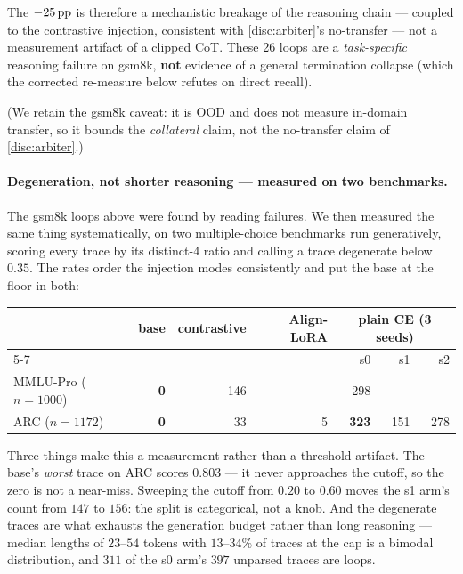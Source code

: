 The $-25\,\mathrm{pp}$ is therefore a mechanistic breakage of the reasoning chain --- coupled
to the contrastive injection, consistent with \cref{disc:arbiter}'s no-transfer ---
not a measurement artifact of a clipped CoT. These 26 loops are a
\emph{task-specific} reasoning failure on gsm8k, \textbf{not} evidence of a general
termination collapse (which the corrected re-measure below refutes on direct
recall).

(We retain the gsm8k caveat: it is OOD and does not measure in-domain transfer, so
it bounds the \emph{collateral} claim, not the no-transfer claim of
\cref{disc:arbiter}.)

\paragraph{Degeneration, not shorter reasoning --- measured on two benchmarks.}
The gsm8k loops above were found by reading failures. We then measured the same
thing systematically, on two multiple-choice benchmarks run generatively, scoring
every trace by its distinct-4 ratio and calling a trace degenerate below $0.35$. The
rates order the injection modes consistently and put the base at the floor in both:

\begin{center}\small
\begin{tabular}{lrrrrrr}
\toprule
& base & contrastive & Align-LoRA & \multicolumn{3}{c}{plain CE (3 seeds)} \\
\cmidrule(lr){5-7}
& & & & s0 & s1 & s2 \\
\midrule
MMLU-Pro ($n{=}1000$) & \textbf{0} & 146 & --- & 298 & --- & --- \\
ARC ($n{=}1172$)      & \textbf{0} & 33  & 5   & \textbf{323} & 151 & 278 \\
\bottomrule
\end{tabular}
\end{center}

Three things make this a measurement rather than a threshold artifact. The base's
\emph{worst} trace on ARC scores $0.803$ --- it never approaches the cutoff, so the
zero is not a near-miss. Sweeping the cutoff from $0.20$ to $0.60$ moves the s1
arm's count from $147$ to $156$: the split is categorical, not a knob. And the
degenerate traces are what exhausts the generation budget rather than long reasoning
--- median lengths of $23$--$54$ tokens with $13$--$34\%$ of traces at the cap is a
bimodal distribution, and $311$ of the s0 arm's $397$ unparsed traces are loops.

